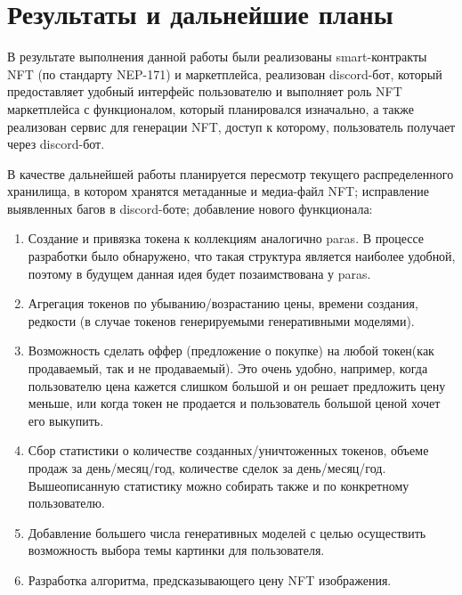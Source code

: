 \section{Результаты и дальнейшие планы}
\label{section.output}
В результате выполнения данной работы были реализованы smart-контракты NFT (по стандарту NEP-171) и маркетплейса, реализован discord-бот, который предоставляет удобный интерфейс пользователю и выполняет роль NFT маркетплейса с функционалом, который планировался изначально, а также реализован сервис для генерации NFT, доступ к которому, пользователь получает через discord-бот.

В качестве дальнейшей работы планируется пересмотр текущего распределенного хранилища, в котором хранятся метаданные и медиа-файл NFT; исправление выявленных багов в discord-боте; добавление нового функционала:
\begin{enumerate}
    \item Создание и привязка токена к коллекциям аналогично paras. В процессе разработки было обнаружено, что такая структура является наиболее удобной, поэтому в будущем данная идея будет позаимствована у paras.
    \item Агрегация токенов по убыванию/возрастанию цены, времени создания, редкости (в случае токенов генерируемыми генеративными моделями).
    \item Возможность сделать оффер (предложение о покупке) на любой токен(как продаваемый, так и не продаваемый). Это очень удобно, например, когда пользователю цена кажется слишком большой и он решает предложить цену меньше, или когда токен не продается и пользователь большой ценой хочет его выкупить.
    \item Сбор статистики о количестве созданных/уничтоженных токенов, объеме продаж за день/месяц/год, количестве сделок за день/месяц/год. Вышеописанную статистику можно собирать также и по конкретному пользователю.
    \item Добавление большего числа генеративных моделей с целью осуществить возможность выбора темы картинки для пользователя.
    \item Разработка алгоритма, предсказывающего цену NFT изображения.
\end{enumerate}

\newpage

